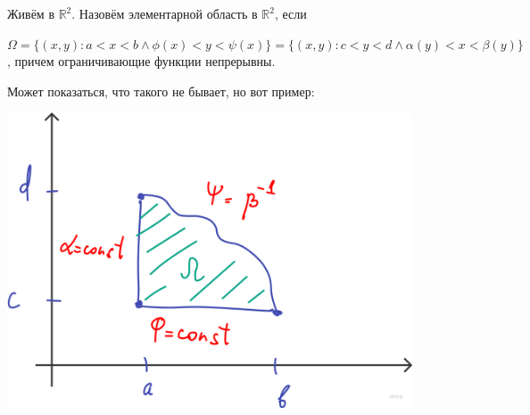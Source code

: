 \begin{definition}
    Живём в $\mathbb{R}^2$. Назовём элементарной область в $\mathbb{R}^2$, если 

    $\Omega = \{ (x, y) : a < x < b \land \phi(x) < y < \psi(x) \} = \{ (x, y): c < y < d \land \alpha(y) < x < \beta(y) \}$, причем ограничивающие функции непрерывны.

    Может показаться, что такого не бывает, но вот пример: 
    
    \begin{center}
        \includegraphics[width=12cm]{assets/03-intergrals-with-params/omega-set-example.png}
    \end{center}
\end{definition}

\newpage

